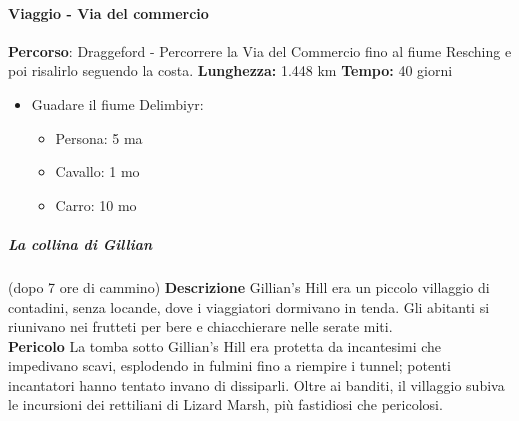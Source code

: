 \documentclass{article}
\begin{document}
        \paragraph{Viaggio - Via del commercio}
        \textbf{Percorso}: Draggeford - Percorrere la Via del Commercio fino al fiume Resching e poi risalirlo seguendo la costa. 
        \textbf{Lunghezza:} 1.448 km
        \textbf{Tempo: }40 giorni
                \begin{itemize}
                    \item Guadare il fiume Delimbiyr:
                    \begin{itemize}
                        \item Persona: 5 ma
                        \item Cavallo: 1 mo
                        \item Carro: 10 mo
                    \end{itemize}
                \end{itemize}

            \subparagraph{La collina di Gillian} (dopo 7 ore di cammino)
                \textbf{Descrizione} 
                Gillian's Hill era un piccolo villaggio di contadini, senza locande, dove i viaggiatori dormivano in tenda. Gli abitanti si riunivano nei frutteti per bere e chiacchierare nelle serate miti.
                \\ 
                \textbf{Pericolo}
                La tomba sotto Gillian’s Hill era protetta da incantesimi che impedivano scavi, esplodendo in fulmini fino a riempire i tunnel; potenti incantatori hanno tentato invano di dissiparli. Oltre ai banditi, il villaggio subiva le incursioni dei rettiliani di Lizard Marsh, più fastidiosi che pericolosi.
\end{document}

